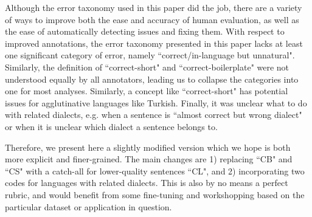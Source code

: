 Although the error taxonomy used in this paper did the job, there are a variety of ways to improve both the ease and accuracy of human evaluation, as well as the ease of automatically detecting issues and fixing them. With respect to improved annotations, the error taxonomy presented in this paper lacks at least one significant category of error, namely ``correct/in-language but unnatural".  Similarly, the definition of ``correct-short" and ``correct-boilerplate" were not understood equally by all annotators, leading us to collapse the categories into one for most analyses. Similarly, a concept like ``correct-short" has potential issues for agglutinative languages like Turkish. Finally, it was unclear what to do with related dialects, e.g. when a sentence is ``almost correct but wrong dialect" or when it is unclear which dialect a sentence belongs to.

Therefore, we present here a slightly modified version which we hope is both more explicit and finer-grained. The main changes are 1) replacing ``CB" and ``CS" with a catch-all for lower-quality sentences ``CL", and 2) incorporating two codes for languages with related dialects. This is also by no means a perfect rubric, and would benefit from some fine-tuning and workshopping based on the particular dataset or application in question.


